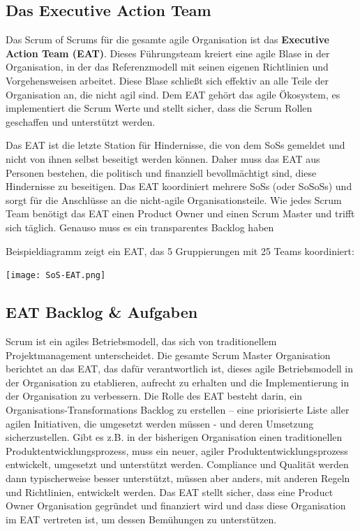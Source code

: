 \documentclass[12pt,a4paper,parskip=full]{scrartcl}
\begin{document}
\subsection{Das Executive Action Team}
Das Scrum of Scrums für die gesamte agile Organisation ist das
\textbf{Executive Action Team (EAT)}. Dieses Führungsteam kreiert eine agile
Blase in der Organisation, in der das Referenzmodell mit seinen eigenen
Richtlinien und Vorgehensweisen arbeitet. Diese Blase schließt sich effektiv
an alle Teile der Organisation an, die nicht agil sind. Dem EAT gehört das
agile Ökosystem, es implementiert die Scrum Werte und stellt sicher, dass die
Scrum Rollen geschaffen und unterstützt werden.

Das EAT ist die letzte Station für Hindernisse, die von dem SoSs gemeldet und
nicht von ihnen selbst beseitigt werden können. Daher muss das EAT aus Personen
bestehen, die politisch und finanziell bevollmächtigt sind, diese Hindernisse
zu beseitigen. Das EAT koordiniert mehrere SoSs (oder SoSoSs) und sorgt für die
Anschlüsse an die nicht-agile Organisationsteile. Wie jedes Scrum Team benötigt
das EAT einen Product Owner und einen Scrum Master und trifft sich täglich.
Genauso muss es ein transparentes Backlog haben


Beispieldiagramm zeigt ein EAT, das 5 Gruppierungen mit 25 Teams koordiniert:

\texttt{[image: SoS-EAT.png]}

\subsection{EAT Backlog \& Aufgaben}
Scrum ist ein agiles Betriebsmodell, das sich von traditionellem Projektmanagement
unterscheidet. Die gesamte Scrum Master Organisation berichtet an das EAT, das
dafür verantwortlich ist, dieses agile Betriebsmodell in der Organisation zu
etablieren, aufrecht zu erhalten und die Implementierung in der Organisation zu
verbessern.
Die Rolle des EAT besteht darin, ein Organisations-Transformations Backlog zu
erstellen – eine priorisierte Liste aller agilen Initiativen, die umgesetzt
werden müssen - und deren Umsetzung sicherzustellen. Gibt es z.B. in der
bisherigen Organisation einen traditionellen Produktentwicklungsprozess, muss
ein neuer, agiler Produktentwicklungsprozess entwickelt, umgesetzt und
unterstützt werden. Compliance und Qualität werden dann typischerweise besser
unterstützt, müssen aber anders, mit anderen Regeln und Richtlinien, entwickelt
werden. Das EAT stellt sicher, dass eine Product Owner Organisation gegründet
und finanziert wird und dass diese Organisation im EAT vertreten ist, um
dessen Bemühungen zu unterstützen.
\end{document}
